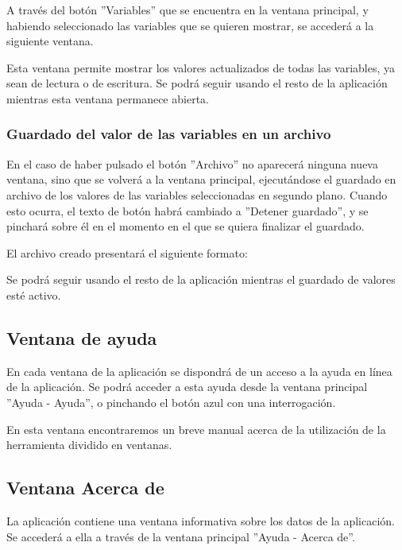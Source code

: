 A través del botón ''Variables'' que se encuentra en la ventana principal, y habiendo seleccionado las variables que se quieren mostrar, se accederá a la siguiente ventana.


Esta ventana permite mostrar los valores actualizados de todas las variables, ya sean de lectura o de escritura. Se podrá seguir usando el resto de la aplicación mientras esta ventana permanece abierta.

\subsubsection{Guardado del valor de las variables en un archivo}

En el caso de haber pulsado el botón ''Archivo'' no aparecerá ninguna nueva ventana, sino que se volverá a la ventana principal, ejecutándose el guardado en archivo de los valores de las variables seleccionadas en segundo plano. Cuando esto ocurra, el texto de botón habrá cambiado a ''Detener guardado'', y se pinchará sobre él en el momento en el 	que se quiera finalizar el guardado.

El archivo creado presentará el siguiente formato:


Se podrá seguir usando el resto de la aplicación mientras el guardado de valores esté activo.

\subsection{Ventana de ayuda}

En cada ventana de la aplicación se dispondrá de un acceso a la ayuda en línea de la aplicación. Se podrá acceder a esta ayuda desde la ventana principal ''Ayuda - Ayuda'', o pinchando el botón azul con una interrogación.


En esta ventana encontraremos un breve manual acerca de la utilización de la herramienta dividido en ventanas.

\subsection{Ventana Acerca de}

La aplicación contiene una ventana informativa sobre los datos de la aplicación. Se accederá a ella a través de la ventana principal ''Ayuda - Acerca de''.

